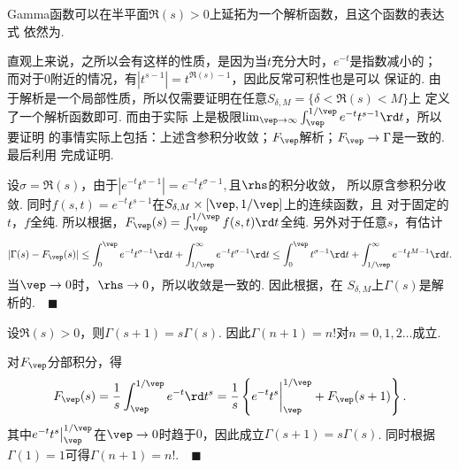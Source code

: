   \begin{thm}[Gamma函数]
    Gamma函数可以在半平面$\Re(s)>0$上延拓为一个解析函数，且这个函数的表达式
    依然为.
  \end{thm}
  \remark
    直观上来说，之所以会有这样的性质，是因为当$t$充分大时，$e^{-t}$是指数减小的；
    而对于$0$附近的情况，有$|t^{s-1}| = t^{\Re(s)-1}$，因此反常可积性也是可以
    保证的.
  \proof
    由于解析是一个局部性质，所以仅需要证明在任意$S_{\delta,M}=\{\delta<\Re(s)<M\}$上
    定义了一个解析函数即可. 而由于实际
    上是极限$\lim_{\vep\to\infty}\int_{\vep}^{1/\vep}e^{-t}t^{s-1}\rd t$，所以要证明
    的事情实际上包括：上述含参积分收敛；$F_\vep$解析；$F_\vep\to \Gamma$是一致的. 最后利用
    完成证明.\par
    设$\sigma=\Re(s)$，由于$|e^{-t}t^{s-1}| = e^{-t}t^{\sigma-1},$且$\rhs$的积分收敛，
    所以原含参积分收敛. 
    同时$f(s,t)=e^{-t}t^{s-1}$在$S_{\delta,M}\times[\vep,1/\vep]$上的连续函数，且
    对于固定的$t$，$f$全纯. 所以根据，$F_\vep(s)=
    \int_{\vep}^{1/\vep}f(s,t)\rd t$全纯. 另外对于任意$s$，有估计
    \[
      |\Gamma(s)-F_\vep(s)|
      \le \int_0^\vep e^{-t}t^{\sigma-1}\rd t 
      + \int_{1/\vep}^\infty e^{-t}t^{\sigma-1}\rd t
      \le \int_0^\vep t^{\sigma-1}\rd t + \int_{1/\vep}^\infty e^{-t}t^{M-1}\rd t.
    \]
    当$\vep\to 0$时，$\rhs\to 0$，所以收敛是一致的. 因此根据，在
    $S_{\delta,M}$上$\Gamma(s)$是解析的.$\quad\blacksquare$

  \begin{lemma}[准周期性]
    \label{lemma: Gamma的准周期性}
    设$\Re(s)>0$，则$\Gamma(s+1)=s\Gamma(s)$. 因此$\Gamma(n+1)=n!$对$n=0,1,2\dots$成立.
  \end{lemma}
  \proof
    对$F_\vep$分部积分，得
    \[\begin{split}
      F_\vep(s) = \frac{1}{s}\int_{\vep}^{1/\vep}e^{-t}\rd t^s 
      = \frac{1}{s}\left\{ e^{-t}t^s\bigg|_{\vep}^{1/\vep} + F_\vep(s+1) \right\}.
    \end{split}\]
    其中$e^{-t}t^s\big|_{\vep}^{1/\vep}$在$\vep\to0$时趋于$0$，因此成立$\Gamma(s+1)=
    s\Gamma(s)$. 同时根据$\Gamma(1)=1$可得$\Gamma(n+1)=n!$.$\quad\blacksquare$


